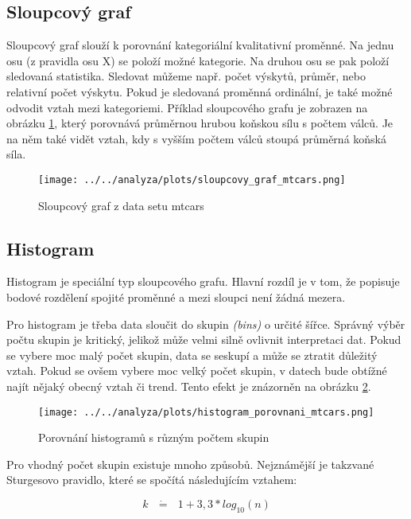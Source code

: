 {\color{red}
\subsection{Sloupcový graf}
Sloupcový graf slouží k porovnání kategoriální kvalitativní proměnné. Na jednu osu (z pravidla osu X) se položí možné kategorie. Na druhou osu
se pak položí sledovaná statistika. Sledovat můžeme např. počet výskytů, průměr, nebo relativní počet výskytu. Pokud je sledovaná proměnná ordinální,
je také možné odvodit vztah mezi kategoriemi. Příklad sloupcového grafu je zobrazen na obrázku \ref{fig:sloupcovy_graf_mtcars}, který
porovnává průměrnou hrubou koňskou sílu s počtem válců. Je na něm také vidět vztah, kdy s vyšším počtem válců stoupá průměrná koňská síla.

\begin{figure}[H]
    \centering
    \texttt{[image: ../../analyza/plots/sloupcovy\_graf\_mtcars.png]}
    \caption{Sloupcový graf z data setu mtcars} 
    \label{fig:sloupcovy_graf_mtcars}
\end{figure}

\subsection{Histogram}

Histogram je speciální typ sloupcového grafu. Hlavní rozdíl je v tom, že popisuje bodové rozdělení spojité proměnné a mezi sloupci není žádná mezera.
}
Pro histogram je třeba data sloučit do skupin \textit{(bins)} o určité šířce. Správný výběr počtu skupin je kritický, jelikož může velmi
silně ovlivnit interpretaci dat. Pokud se vybere moc malý počet skupin, data se seskupí a může se ztratit důležitý vztah. Pokud se ovšem
vybere moc velký počet skupin, v datech bude obtížné najít nějaký obecný vztah či trend.
Tento efekt je znázorněn na obrázku \ref{fig:histogram_porovnani_mtcars}.

\begin{figure}[H]
    \centering
    \texttt{[image: ../../analyza/plots/histogram\_porovnani\_mtcars.png]}
    \caption{Porovnání histogramů s různým počtem skupin} 
    \label{fig:histogram_porovnani_mtcars}
\end{figure}

Pro vhodný počet skupin existuje mnoho způsobů. Nejznámější je takzvané Sturgesovo pravidlo, které se spočítá následujícím vztahem:

\begin{equation}
    \label{eq:sturgesovo_pravidlo}
    k \text{ } \dot{\mathbf{=}} \text{ } 1 + 3,3 * log_{10}(n)
\end{equation}

